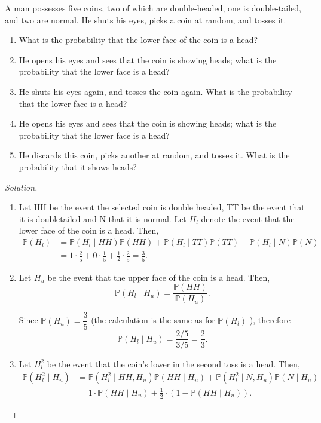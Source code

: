 \documentclass[11pt,singlecolumn, openany, citestyle=authoryear]{elegantbook}
\begin{document}
\begin{CJK}{UTF8}{gbsn}
\begin{exercise}
    A man possesses five coins, two of which are double-headed, one is double-tailed, 
    and two are normal. He shuts his eyes, picks a coin at random, and tosses it. 
    \begin{enumerate}
    \item What is the probability that the lower face of the coin is a head?

    \item He opens his eyes and sees that the coin is showing heads; what is the probability that the lower face is a head?
    
    \item He shuts his eyes again, and tosses the coin again. What is the probability that the lower face is a head?
    
    \item He opens his eyes and sees that the coin is showing heads; what is the probability that the lower face is a head?
    
    \item He discards this coin, picks another at random, and tosses it. What is the probability that it shows heads?
    \end{enumerate}
\end{exercise}
\begin{proof}[Solution]
    \begin{enumerate}
    \item  Let HH be the event the selected coin is double headed, TT be the event that it is doubletailed and $\mathrm{N}$ that it is normal. Let $H_l$ denote the event that the lower face of the coin is a head. Then,
    \begin{align*}
    \mathbb{P}\left(H_l\right)&=\mathbb{P}\left(H_l \mid H H\right) \mathbb{P}(H H)+\mathbb{P}\left(H_l \mid T T\right) \mathbb{P}(T T)+\mathbb{P}\left(H_l \mid N\right) \mathbb{P}(N)\\
    &=1 \cdot \frac{2}{5}+0 \cdot \frac{1}{5}+\frac{1}{2} \cdot \frac{2}{5}=\frac{3}{5} .
    \end{align*}
    \item Let $H_u$ be the event that the upper face of the coin is a head. Then,
    $$
    \mathbb{P}\left(H_l \mid H_u\right)=\frac{\mathbb{P}(H H)}{\mathbb{P}\left(H_u\right)} .
    $$
    
    Since $\mathbb{P}\left(H_u\right)=\dfrac{3}{5}$ (the calculation is the same as for $\mathbb{P}\left(H_l\right)$ ), therefore
    $$
    \mathbb{P}\left(H_l \mid H_u\right)=\frac{2 / 5}{3 / 5}=\frac{2}{3} .
    $$
    \item Let $H_l^2$ be the event that the coin's lower in the second toss is a head. Then,
    \begin{align*}
    \mathbb{P}\left(H_l^2 \mid H_u\right)&=\mathbb{P}\left(H_l^2 \mid H H, H_u\right) \mathbb{P}\left(H H \mid H_u\right)+\mathbb{P}\left(H_l^2 \mid N, H_u\right) \mathbb{P}\left(N \mid H_u\right)\\
    &=1 \cdot \mathbb{P}\left(H H \mid H_u\right)+\frac{1}{2} \cdot\left(1-\mathbb{P}\left(H H \mid H_u\right)\right) .
    \end{align*}
    

\end{enumerate}
\end{proof}
\end{CJK}
\end{document}
